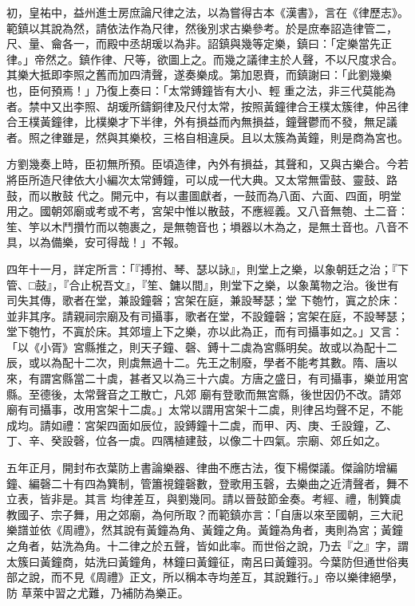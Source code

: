 \begin{pinyinscope}
 初，皇祐中，益州進士房庶論尺律之法，以為嘗得古本《漢書》，言在《律歷志》。範鎮以其說為然，請依法作為尺律，然後別求古樂參考。於是庶奉詔造律管二，尺、量、龠各一，而殿中丞胡瑗以為非。詔鎮與幾等定樂，鎮曰：「定樂當先正律。」帝然之。鎮作律、尺等，欲圖上之。而幾之議律主於人聲，不以尺度求合。其樂大抵即李照之舊而加四清聲，遂奏樂成。第加恩賚，而鎮謝曰：「此劉幾樂也，臣何預焉！」乃復上奏曰：「太常鎛鐘皆有大小、輕
 重之法，非三代莫能為者。禁中又出李照、胡瑗所鑄銅律及尺付太常，按照黃鐘律合王樸太簇律，仲呂律合王樸黃鐘律，比樸樂才下半律，外有損益而內無損益，鐘聲鬱而不發，無足議者。照之律雖是，然與其樂校，三格自相違戾。且以太簇為黃鐘，則是商為宮也。



 方劉幾奏上時，臣初無所預。臣頃造律，內外有損益，其聲和，又與古樂合。今若將臣所造尺律依大小編次太常鎛鐘，可以成一代大典。又太常無雷鼓、靈鼓、路鼓，而以散鼓
 代之。開元中，有以畫圖獻者，一鼓而為八面、六面、四面，明堂用之。國朝郊廟或考或不考，宮架中惟以散鼓，不應經義。又八音無匏、土二音：笙、竽以木鬥攢竹而以匏裹之，是無匏音也；塤器以木為之，是無土音也。八音不具，以為備樂，安可得哉！」不報。



 四年十一月，詳定所言：「『搏拊、琴、瑟以詠』，則堂上之樂，以象朝廷之治；『下管、□鼓』，『合止柷吾文』，『笙、鏞以間』，則堂下之樂，以象萬物之治。後世有司失其傳，歌者在堂，兼設鐘磬；宮架在庭，兼設琴瑟；堂
 下匏竹，寘之於床：並非其序。請親祠宗廟及有司攝事，歌者在堂，不設鐘磬；宮架在庭，不設琴瑟；堂下匏竹，不寘於床。其郊壇上下之樂，亦以此為正，而有司攝事如之。」又言：「以《小胥》宮縣推之，則天子鐘、磬、鎛十二虡為宮縣明矣。故或以為配十二辰，或以為配十二次，則虡無過十二。先王之制廢，學者不能考其數。隋、唐以來，有謂宮縣當二十虡，甚者又以為三十六虡。方唐之盛日，有司攝事，樂並用宮縣。至德後，太常聲音之工散亡，凡郊
 廟有登歌而無宮縣，後世因仍不改。請郊廟有司攝事，改用宮架十二虡。」太常以謂用宮架十二虡，則律呂均聲不足，不能成均。請如禮：宮架四面如辰位，設鎛鐘十二虡，而甲、丙、庚、壬設鐘，乙、丁、辛、癸設磬，位各一虡。四隅植建鼓，以像二十四氣。宗廟、郊丘如之。



 五年正月，開封布衣葉防上書論樂器、律曲不應古法，復下楊傑議。傑論防增編鐘、編磬二十有四為簨制，管簫視鐘磬數，登歌用玉磬，去樂曲之近清聲者，舞不立表，皆非是。其言
 均律差互，與劉幾同。請以晉鼓節金奏。考經、禮，制簨虡教國子、宗子舞，用之郊廟，為何所取？而範鎮亦言：「自唐以來至國朝，三大祀樂譜並依《周禮》，然其說有黃鐘為角、黃鐘之角。黃鐘為角者，夷則為宮；黃鐘之角者，姑洗為角。十二律之於五聲，皆如此率。而世俗之說，乃去『之』字，謂太簇曰黃鐘商，姑洗曰黃鐘角，林鐘曰黃鐘征，南呂曰黃鐘羽。今葉防但通世俗夷部之說，而不見《周禮》正文，所以稱本寺均差互，其說難行。」帝以樂律絕學，防
 草萊中習之尤難，乃補防為樂正。




\end{pinyinscope}
